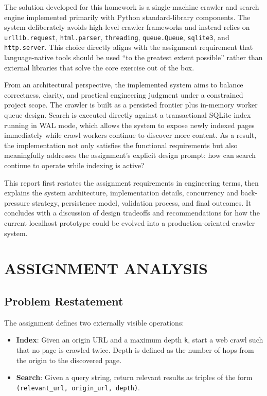 \documentclass[pdftex,12pt,a4paper]{article}
\begin{document}
The solution developed for this homework is a single-machine crawler and search engine implemented primarily with Python standard-library components. The system deliberately avoids high-level crawler frameworks and instead relies on \texttt{urllib.request}, \texttt{html.parser}, \texttt{threading}, \texttt{queue.Queue}, \texttt{sqlite3}, and \texttt{http.server}. This choice directly aligns with the assignment requirement that language-native tools should be used ``to the greatest extent possible'' rather than external libraries that solve the core exercise out of the box.

From an architectural perspective, the implemented system aims to balance correctness, clarity, and practical engineering judgment under a constrained project scope. The crawler is built as a persisted frontier plus in-memory worker queue design. Search is executed directly against a transactional SQLite index running in WAL mode, which allows the system to expose newly indexed pages immediately while crawl workers continue to discover more content. As a result, the implementation not only satisfies the functional requirements but also meaningfully addresses the assignment's explicit design prompt: how can search continue to operate while indexing is active?

This report first restates the assignment requirements in engineering terms, then explains the system architecture, implementation details, concurrency and back-pressure strategy, persistence model, validation process, and final outcomes. It concludes with a discussion of design tradeoffs and recommendations for how the current localhost prototype could be evolved into a production-oriented crawler system.

\section{ASSIGNMENT ANALYSIS}
\label{sec:assignment_analysis}

\subsection{Problem Restatement}

The assignment defines two externally visible operations:

\begin{itemize}
    \item \textbf{Index}: Given an origin URL and a maximum depth \texttt{k}, start a web crawl such that no page is crawled twice. Depth is defined as the number of hops from the origin to the discovered page.
    \item \textbf{Search}: Given a query string, return relevant results as triples of the form \texttt{(relevant\_url, origin\_url, depth)}.
\end{itemize}
\end{document}
